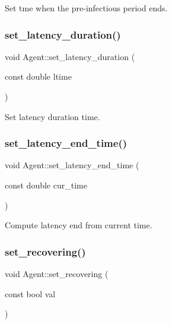 Set tme when the pre-\/infectious period ends. 

\mbox{\label{classAgent_a3f8ddc8e37400ca8f37705248e61d328}} 
\subsubsection{\texorpdfstring{set\+\_\+latency\+\_\+duration()}{set\_latency\_duration()}}
{\footnotesize\ttfamily void Agent\+::set\+\_\+latency\+\_\+duration (\begin{DoxyParamCaption}\item[{const double}]{ltime }\end{DoxyParamCaption})\hspace{0.3cm}{\ttfamily [inline]}}



Set latency duration time. 

\mbox{\label{classAgent_a0c99e711b0685c67da58a87556380931}} 
\subsubsection{\texorpdfstring{set\+\_\+latency\+\_\+end\+\_\+time()}{set\_latency\_end\_time()}}
{\footnotesize\ttfamily void Agent\+::set\+\_\+latency\+\_\+end\+\_\+time (\begin{DoxyParamCaption}\item[{const double}]{cur\+\_\+time }\end{DoxyParamCaption})\hspace{0.3cm}{\ttfamily [inline]}}



Compute latency end from current time. 

\mbox{\label{classAgent_a30f78d00b5e77545919f1045de389cc0}} 
\subsubsection{\texorpdfstring{set\+\_\+recovering()}{set\_recovering()}}
{\footnotesize\ttfamily void Agent\+::set\+\_\+recovering (\begin{DoxyParamCaption}\item[{const bool}]{val }\end{DoxyParamCaption})\hspace{0.3cm}{\ttfamily [inline]}}

